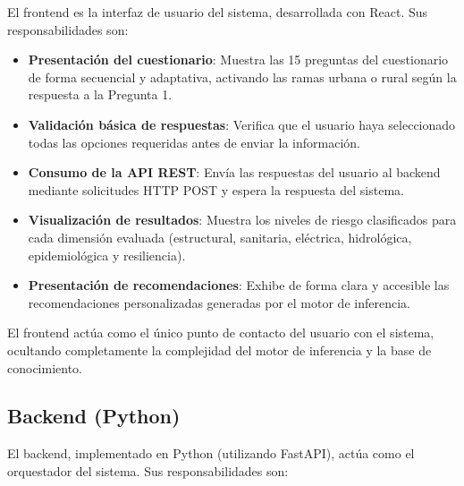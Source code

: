 \documentclass[12pt, letterpaper]{article}
\begin{document}
El frontend es la interfaz de usuario del sistema, desarrollada con React. Sus responsabilidades son:

\begin{itemize}
  \item \textbf{Presentación del cuestionario}: Muestra las 15 preguntas del cuestionario de forma secuencial y adaptativa, activando las ramas urbana o rural según la respuesta a la Pregunta 1.
  \item \textbf{Validación básica de respuestas}: Verifica que el usuario haya seleccionado todas las opciones requeridas antes de enviar la información.
  \item \textbf{Consumo de la API REST}: Envía las respuestas del usuario al backend mediante solicitudes HTTP POST y espera la respuesta del sistema.
  \item \textbf{Visualización de resultados}: Muestra los niveles de riesgo clasificados para cada dimensión evaluada (estructural, sanitaria, eléctrica, hidrológica, epidemiológica y resiliencia).
  \item \textbf{Presentación de recomendaciones}: Exhibe de forma clara y accesible las recomendaciones personalizadas generadas por el motor de inferencia.
\end{itemize}

El frontend actúa como el único punto de contacto del usuario con el sistema, ocultando completamente la complejidad del motor de inferencia y la base de conocimiento.

\subsection{Backend (Python)}

El backend, implementado en Python (utilizando FastAPI), actúa como el orquestador del sistema. Sus responsabilidades son:
\end{document}

